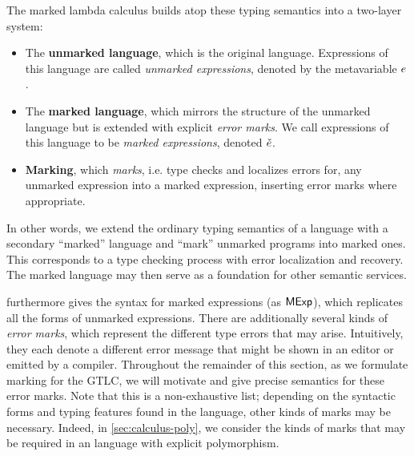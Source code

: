 The marked lambda calculus builds atop these typing semantics into a two-layer system:
%
\begin{itemize}
  \item The \textbf{unmarked language}, which is the original language. Expressions of this language
    are called \emph{unmarked expressions}, denoted by the metavariable $e$.

  \item The \textbf{marked language}, which mirrors the structure of the unmarked language but is
    extended with explicit \emph{error marks}. We call expressions of this language to be
    \emph{marked expressions}, denoted $\check{e}$.

  \item \textbf{Marking}, which \emph{marks}, i.e. type checks and localizes errors for, any unmarked
    expression into a marked expression, inserting error marks where appropriate.
\end{itemize}
%
In other words, we extend the ordinary typing semantics of a language with a secondary ``marked''
language and ``mark'' unmarked programs into marked ones. This corresponds to a type checking
process with error localization and recovery. The marked language may then serve as a foundation for
other semantic services. %


 furthermore gives the syntax for marked expressions (as ${\normalfont\textsf{MExp}}$),
which replicates all the forms of unmarked expressions. There are additionally several kinds of
\emph{error marks}, which represent the different type errors that may arise. Intuitively, they each
denote a different error message that might be shown in an editor or emitted by a compiler.
%
%
%
%
%
%
Throughout the remainder of this section, as we formulate marking for the GTLC, we will motivate and
give precise semantics for these error marks. Note that this is a non-exhaustive list; depending on
the syntactic forms and typing features found in the language, other kinds of marks may be
necessary. Indeed, in \cref{sec:calculus-poly}, we consider the kinds of marks that may be required
in an language with explicit polymorphism.

